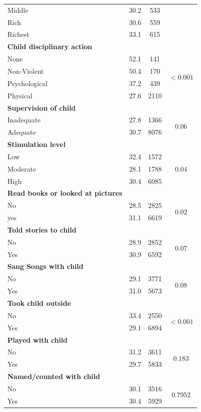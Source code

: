 \documentclass[
  12pt,
  oneside]{report}
\begin{document}
\begin{longtable}{lccc}
Middle & 30.2 & 533 &  \\*
Rich & 30.6 & 559 &  \\*
Richest & 33.1 & 615 &  \\
\multicolumn{4}{l}{\textbf{Child disciplinary action}} \\*
None & 52.1 & 141 & \multirow{4}{*}{$<0.001$} \\*
Non-Violent & 50.4 & 170 &  \\*
Psychological & 37.2 & 439 &  \\*
Physical & 27.6 & 2110 &  \\
\textbf{Supervision of child} & \multicolumn{1}{l}{} & \multicolumn{1}{l}{} & \multicolumn{1}{l}{} \\*
Inadequate & 27.8 & 1366 & \multirow{2}{*}{$0.06$} \\*
Adequate & 30.7 & 8076 &  \\
\textbf{Stimulation level} & \multicolumn{1}{l}{} & \multicolumn{1}{l}{} & \multicolumn{1}{l}{} \\*
Low & 32.4 & 1572 & \multirow{3}{*}{$0.04$} \\*
Moderate & 28.1 & 1788 &  \\*
High & 30.4 & 6085 &  \\
\textbf{Read books or looked at pictures} & \multicolumn{1}{l}{} & \multicolumn{1}{l}{} & \multicolumn{1}{l}{} \\*
No & 28.5 & 2825 & \multirow{2}{*}{$0.02$} \\*
yes & 31.1 & 6619 &  \\
\textbf{Told stories to child} & \multicolumn{1}{l}{} & \multicolumn{1}{l}{} & \multicolumn{1}{l}{} \\*
No & 28.9 & 2852 & \multirow{2}{*}{$0.07$} \\*
Yes & 30.9 & 6592 &  \\
\textbf{Sang Songs with child} & \multicolumn{1}{l}{} & \multicolumn{1}{l}{} & \multicolumn{1}{l}{} \\*
No & 29.1 & 3771 & \multirow{2}{*}{$0.08$} \\*
Yes & 31.0 & 5673 &  \\
\textbf{Took child outside} & \multicolumn{1}{l}{} & \multicolumn{1}{l}{} & \multicolumn{1}{l}{} \\*
No & 33.4 & 2550 & \multirow{2}{*}{$<0.001$} \\*
Yes & 29.1 & 6894 &  \\
\textbf{Played with child} & \multicolumn{1}{l}{} & \multicolumn{1}{l}{} & \multicolumn{1}{l}{} \\*
No & 31.2 & 3611 & \multirow{2}{*}{$0.183$} \\*
Yes & 29.7 & 5833 &  \\
\textbf{Named/counted with child} & \multicolumn{1}{l}{} & \multicolumn{1}{l}{} & \multicolumn{1}{l}{} \\*
No & 30.1 & 3516 & \multirow{2}{*}{$0.7952$} \\*
Yes & 30.4 & 5929 &  \\
\bottomrule
\end{longtable}
\end{document}
